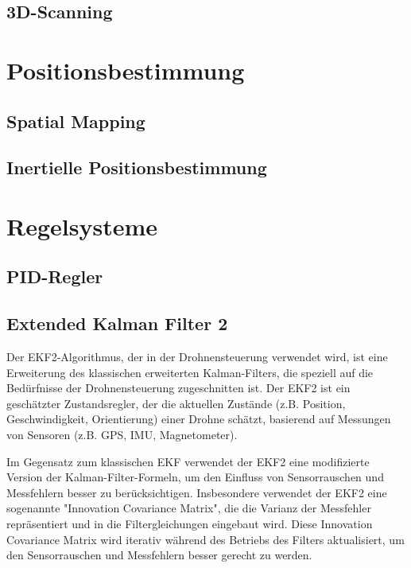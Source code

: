     \subsection{3D-Scanning} \label{3d-scanning:subsection}

\section{Positionsbestimmung} \label{positionsbestimmung:section}

    \subsection{Spatial Mapping} \label{spatial_mapping:subsection}

    \subsection{Inertielle Positionsbestimmung} \label{inertielle_positionsbestimmung:subsection}

\section{Regelsysteme} \label{regelsysteme:section}

    \subsection{PID-Regler} \label{pid_regler:subsection}

    \subsection{Extended Kalman Filter 2}
    Der \ac{EKF}2-Algorithmus, der in der Drohnensteuerung verwendet wird, ist eine Erweiterung des klassischen erweiterten Kalman-Filters, die speziell auf die Bedürfnisse der Drohnensteuerung zugeschnitten ist. Der EKF2 ist ein geschätzter Zustandsregler, der die aktuellen Zustände (z.B. Position, Geschwindigkeit, Orientierung) einer Drohne schätzt, basierend auf Messungen von Sensoren (z.B. GPS, IMU, Magnetometer).

Im Gegensatz zum klassischen EKF verwendet der EKF2 eine modifizierte Version der Kalman-Filter-Formeln, um den Einfluss von Sensorrauschen und Messfehlern besser zu berücksichtigen. Insbesondere verwendet der EKF2 eine sogenannte "Innovation Covariance Matrix", die die Varianz der Messfehler repräsentiert und in die Filtergleichungen eingebaut wird. Diese Innovation Covariance Matrix wird iterativ während des Betriebs des Filters aktualisiert, um den Sensorrauschen und Messfehlern besser gerecht zu werden.

